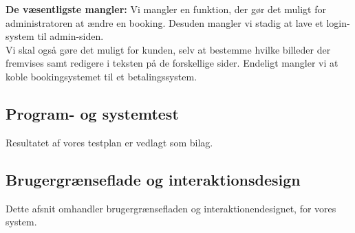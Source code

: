 \documentclass[12pt,a4paper]{article}
\begin{document}
\textbf{De væsentligste mangler:}
Vi mangler en funktion, der gør det muligt for administratoren at ændre en booking. Desuden mangler vi stadig at lave et login-system til admin-siden.\\
Vi skal også gøre det muligt for kunden, selv at bestemme hvilke billeder der fremvises samt redigere i teksten på de forskellige sider. Endeligt mangler vi at koble bookingsystemet til et betalingssystem.
\subsection{Program- og systemtest}
Resultatet af vores testplan er vedlagt som bilag.
\subsection{Brugergrænseflade og interaktionsdesign}
Dette afsnit omhandler brugergrænsefladen og interaktionendesignet, for vores system. 
\end{document}

